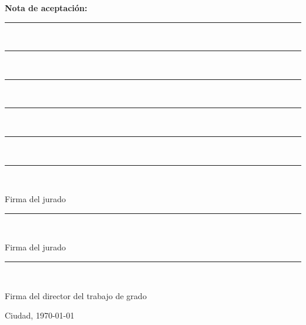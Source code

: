 \noindent
\begin{minipage}[t]{0.3\textwidth}
\textbf{Nota de aceptación:}

\end{minipage}
\hfill
\begin{minipage}[t]{0.6\textwidth}

\vspace{0.8cm}
\rule{\textwidth}{0.4pt}\\[0.5cm]
\rule{\textwidth}{0.4pt}\\[0.5cm]
\rule{\textwidth}{0.4pt}\\[0.5cm]
\rule{\textwidth}{0.4pt}\\[0.5cm]
\rule{\textwidth}{0.4pt}\\[2cm]
\rule{0.9\textwidth}{0.4pt}\\
\raggedright Firma del jurado

\vspace{1.2cm}
\rule{0.9\textwidth}{0.4pt}\\
\raggedright Firma del jurado

\vspace{1.2cm}
\rule{0.9\textwidth}{0.4pt}\\
\raggedright Firma del director del trabajo de grado
\end{minipage}

\vspace{2cm}
\vfill
Ciudad, \today